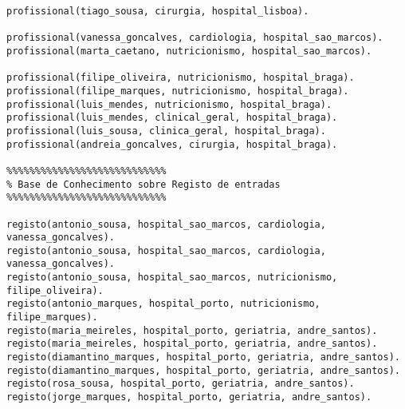 \documentclass[
  oneside,
  10pt, a4paper,
  footinclude=true,
  headinclude=true,
  cleardoublepage=empty
]{scrbook}
\begin{document}
\begin{lstlisting}
profissional(tiago_sousa, cirurgia, hospital_lisboa).

profissional(vanessa_goncalves, cardiologia, hospital_sao_marcos).
profissional(marta_caetano, nutricionismo, hospital_sao_marcos).

profissional(filipe_oliveira, nutricionismo, hospital_braga).
profissional(filipe_marques, nutricionismo, hospital_braga).
profissional(luis_mendes, nutricionismo, hospital_braga).
profissional(luis_mendes, clinical_geral, hospital_braga).
profissional(luis_sousa, clinica_geral, hospital_braga).
profissional(andreia_goncalves, cirurgia, hospital_braga).

%%%%%%%%%%%%%%%%%%%%%%%%%%%%
% Base de Conhecimento sobre Registo de entradas 
%%%%%%%%%%%%%%%%%%%%%%%%%%%%

registo(antonio_sousa, hospital_sao_marcos, cardiologia, vanessa_goncalves).
registo(antonio_sousa, hospital_sao_marcos, cardiologia, vanessa_goncalves).
registo(antonio_sousa, hospital_sao_marcos, nutricionismo, filipe_oliveira).
registo(antonio_marques, hospital_porto, nutricionismo, filipe_marques).
registo(maria_meireles, hospital_porto, geriatria, andre_santos).
registo(maria_meireles, hospital_porto, geriatria, andre_santos).
registo(diamantino_marques, hospital_porto, geriatria, andre_santos).
registo(diamantino_marques, hospital_porto, geriatria, andre_santos).
registo(rosa_sousa, hospital_porto, geriatria, andre_santos).
registo(jorge_marques, hospital_porto, geriatria, andre_santos).
	\end{lstlisting}	
\end{document}
